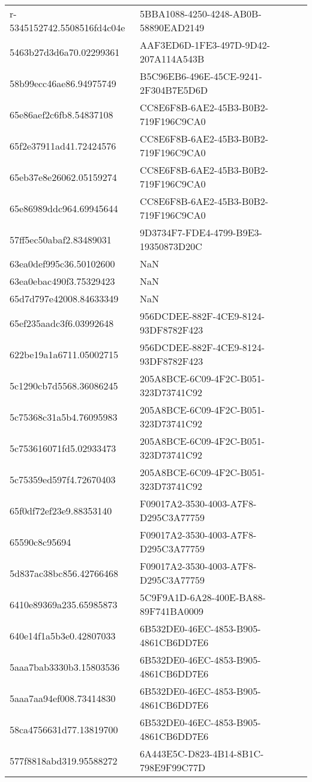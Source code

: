 \begin{tabular}{ll}
r-5345152742.5508516fd4c04e & 5BBA1088-4250-4248-AB0B-58890EAD2149 \\
5463b27d3d6a70.02299361 & AAF3ED6D-1FE3-497D-9D42-207A114A543B \\
58b99ecc46ae86.94975749 & B5C96EB6-496E-45CE-9241-2F304B7E5D6D \\
65e86aef2c6fb8.54837108 & CC8E6F8B-6AE2-45B3-B0B2-719F196C9CA0 \\
65f2e37911ad41.72424576 & CC8E6F8B-6AE2-45B3-B0B2-719F196C9CA0 \\
65eb37e8e26062.05159274 & CC8E6F8B-6AE2-45B3-B0B2-719F196C9CA0 \\
65e86989ddc964.69945644 & CC8E6F8B-6AE2-45B3-B0B2-719F196C9CA0 \\
57ff5ec50abaf2.83489031 & 9D3734F7-FDE4-4799-B9E3-19350873D20C \\
63ea0def995c36.50102600 & NaN \\
63ea0ebac490f3.75329423 & NaN \\
65d7d797e42008.84633349 & NaN \\
65ef235aadc3f6.03992648 & 956DCDEE-882F-4CE9-8124-93DF8782F423 \\
622be19a1a6711.05002715 & 956DCDEE-882F-4CE9-8124-93DF8782F423 \\
5c1290cb7d5568.36086245 & 205A8BCE-6C09-4F2C-B051-323D73741C92 \\
5c75368c31a5b4.76095983 & 205A8BCE-6C09-4F2C-B051-323D73741C92 \\
5c753616071fd5.02933473 & 205A8BCE-6C09-4F2C-B051-323D73741C92 \\
5c75359ed597f4.72670403 & 205A8BCE-6C09-4F2C-B051-323D73741C92 \\
65f0df72ef23e9.88353140 & F09017A2-3530-4003-A7F8-D295C3A77759 \\
65590c8c95694 & F09017A2-3530-4003-A7F8-D295C3A77759 \\
5d837ac38bc856.42766468 & F09017A2-3530-4003-A7F8-D295C3A77759 \\
6410e89369a235.65985873 & 5C9F9A1D-6A28-400E-BA88-89F741BA0009 \\
640e14f1a5b3e0.42807033 & 6B532DE0-46EC-4853-B905-4861CB6DD7E6 \\
5aaa7bab3330b3.15803536 & 6B532DE0-46EC-4853-B905-4861CB6DD7E6 \\
5aaa7aa94ef008.73414830 & 6B532DE0-46EC-4853-B905-4861CB6DD7E6 \\
58ca4756631d77.13819700 & 6B532DE0-46EC-4853-B905-4861CB6DD7E6 \\
577f8818abd319.95588272 & 6A443E5C-D823-4B14-8B1C-798E9F99C77D \\

\end{tabular}
